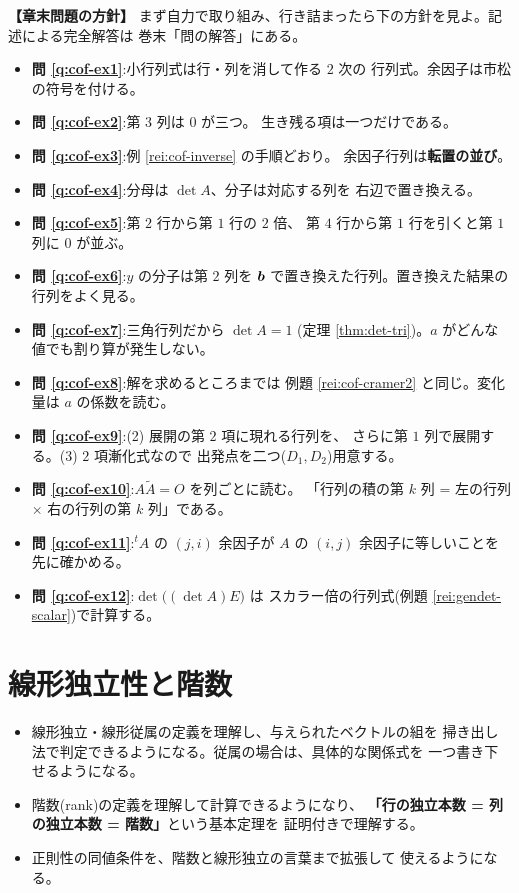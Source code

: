 \bigskip
{\small
\noindent\textbf{【章末問題の方針】}\quad
まず自力で取り組み、行き詰まったら下の方針を見よ。記述による完全解答は
巻末「問の解答」にある。
\begin{itemize}
\item \textbf{問 \ref{q:cof-ex1}}:小行列式は行・列を消して作る $2$ 次の
行列式。余因子は市松の符号を付ける。
\item \textbf{問 \ref{q:cof-ex2}}:第 $3$ 列は $0$ が三つ。
生き残る項は一つだけである。
\item \textbf{問 \ref{q:cof-ex3}}:例 \ref{rei:cof-inverse} の手順どおり。
余因子行列は\textbf{転置の並び}。
\item \textbf{問 \ref{q:cof-ex4}}:分母は $\det A$、分子は対応する列を
右辺で置き換える。
\item \textbf{問 \ref{q:cof-ex5}}:第 $2$ 行から第 $1$ 行の $2$ 倍、
第 $4$ 行から第 $1$ 行を引くと第 $1$ 列に $0$ が並ぶ。
\item \textbf{問 \ref{q:cof-ex6}}:$y$ の分子は第 $2$ 列を
$\bm{b}$ で置き換えた行列。置き換えた結果の行列をよく見る。
\item \textbf{問 \ref{q:cof-ex7}}:三角行列だから $\det A = 1$
(定理 \ref{thm:det-tri})。$a$ がどんな値でも割り算が発生しない。
\item \textbf{問 \ref{q:cof-ex8}}:解を求めるところまでは
例題 \ref{rei:cof-cramer2} と同じ。変化量は $a$ の係数を読む。
\item \textbf{問 \ref{q:cof-ex9}}:(2) 展開の第 $2$ 項に現れる行列を、
さらに第 $1$ 列で展開する。(3) $2$ 項漸化式なので
出発点を二つ($D_1, D_2$)用意する。
\item \textbf{問 \ref{q:cof-ex10}}:$A\widetilde{A} = O$ を列ごとに読む。
「行列の積の第 $k$ 列 = 左の行列 $\times$ 右の行列の第 $k$ 列」である。
\item \textbf{問 \ref{q:cof-ex11}}:${}^t\!A$ の $(j, i)$ 余因子が
$A$ の $(i, j)$ 余因子に等しいことを先に確かめる。
\item \textbf{問 \ref{q:cof-ex12}}:$\det\bigl((\det A)E\bigr)$ は
スカラー倍の行列式(例題 \ref{rei:gendet-scalar})で計算する。
\end{itemize}
}

\chapter{線形独立性と階数}\label{chap:rank}

\begin{goal}
\begin{itemize}
\item 線形独立・線形従属の定義を理解し、与えられたベクトルの組を
掃き出し法で判定できるようになる。従属の場合は、具体的な関係式を
一つ書き下せるようになる。
\item 階数(rank)の定義を理解して計算できるようになり、
\textbf{「行の独立本数 = 列の独立本数 = 階数」}という基本定理を
証明付きで理解する。
\item 正則性の同値条件を、階数と線形独立の言葉まで拡張して
使えるようになる。
\end{itemize}
\end{goal}

